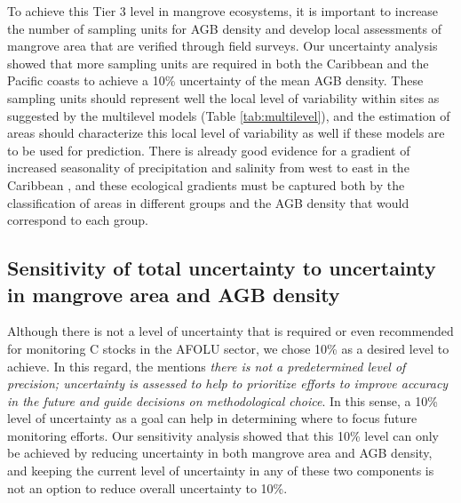 \documentclass[review, authoryear]{elsarticle}   	%
\begin{document}


To achieve this Tier 3 level in mangrove ecosystems, it is important to increase the number of sampling units for AGB density and develop local assessments of mangrove area that are verified through field surveys. Our uncertainty analysis showed that more sampling units are required in both the Caribbean and the Pacific coasts to achieve a 10\% uncertainty of the mean AGB density. These sampling units should represent well the local level of variability within sites as suggested by the multilevel models (Table \ref{tab:multilevel}), and the estimation of areas should characterize this local level of variability as well if these models are to be used for prediction. There is already good evidence for a gradient of increased seasonality of precipitation and salinity from west to east in the Caribbean \citep{Polania2015}, and these ecological gradients must be captured both by the classification of areas in different groups and the AGB density that would correspond to each group. 

\subsection{Sensitivity of total uncertainty to uncertainty in mangrove area and AGB density}
Although there is not a level of uncertainty that is required or even recommended for monitoring C stocks in the AFOLU sector, we chose 10\% as a desired level to achieve. In this regard, the \citet{IPCC2003} mentions \emph{there is not a predetermined level of precision; uncertainty is assessed to help to prioritize efforts to improve accuracy in the future and guide decisions on methodological choice}. In this sense, a 10\% level of uncertainty as a goal can help in determining where to focus future monitoring efforts. Our sensitivity analysis showed that this 10\% level can only be achieved by reducing uncertainty in both mangrove area and AGB density, and keeping the current level of uncertainty in any of these two components is not an option to reduce overall uncertainty to 10\%. 
\end{document}

